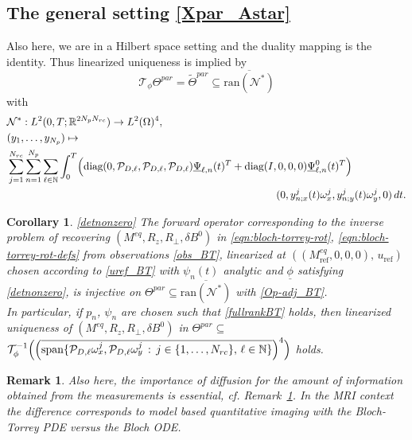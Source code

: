 \documentclass[12pt]{article}
\newtheorem{corollary}[theorem]{Corollary}
\newtheorem{remark}[theorem]{Remark}
\newcommand\Op{\mathcal{N}}
\newcommand\Proj{\mathcal{P}}
\newcommand\coilsens{\omega}
\newcommand\ulPsi{\underline{\Psi}}
\newcommand\Ncont{N_p}
\newcommand\Ncoil{N_{rc}}
\begin{document}
\subsection{The general setting \eqref{Xpar_Astar}} 
Also here, we are in a Hilbert space setting and the duality mapping is the identity. Thus linearized uniqueness is implied by 
\[
\mathcal{T}_\phi\Theta^{par}=\tilde{\Theta}^{par}\subseteq \overline{\text{ran}(\Op^*)}
\]
with 
\begin{equation}\label{Op-adj_BT}
\begin{aligned}
&\Op^*:L^2(0,T;\mathbb{R}^{2\Ncont\Ncoil})\to L^2(\Omega)^4, \quad \\ 
&(y_1,\ldots,y_{\Ncont})\mapsto\\ 
&\sum_{j=1}^{\Ncoil}\sum_{n=1}^{\Ncont}
\sum_{\ell\in\mathbb{N}}
\int_0^T 
\Bigl(\text{diag}(0,\Proj_{D,\ell},\Proj_{D,\ell},\Proj_{D,\ell})\ulPsi_{\ell,n}(t)^T
+\text{diag}(I,0,0,0)\ulPsi_{\ell,n}^0(t)^T
\Bigr)
\\&\hspace*{9cm}
(0,y_{n;x}^j(t)\coilsens_x^j,y_{n;y}^j(t)\coilsens_y^j,0)\, dt.
\end{aligned}
\end{equation}
\begin{corollary}\label{cor:BT}
\eqref{detnonzero} 
The forward operator corresponding to the inverse problem of recovering  $(M^{eq},R_z,R_\perp,\delta B^0)$ in \eqref{eqn:bloch-torrey-rot}, \eqref{eqn:bloch-torrey-rot-defs} from observations \eqref{obs_BT}, linearized at $((M^{eq}_{\text{ref}},0,0,0),\,u_{\text{ref}})$ chosen according to \eqref{uref_BT} with $\psi_n(t)$ analytic and $\underline{\phi}$ satisfying \eqref{detnonzero}, is injective on 
$\Theta^{par}\subseteq\overline{\text{ran}(\Op^*)}$ with \eqref{Op-adj_BT}.
\\
In particular, if $p_n$, $\psi_n$ are chosen such that \eqref{fullrankBT} holds, then linearized uniqueness of $(M^{eq},R_z,R_\perp,\delta B^0)$ in $\Theta^{par}\subseteq$ 
$
\mathcal{T}_\phi^{-1}\Bigl(\Bigl(\overline{\text{span}\{\Proj_{D,\ell}\coilsens_x^j,\Proj_{D,\ell}\coilsens_y^j\,:\, j\in\{1,\ldots,\Ncoil\},\,\ell\in\mathbb{N}\}}\Bigr)^4\Bigr)
$ holds.
\end{corollary}

\begin{remark}\label{rem:diff_BT}
Also here, the importance of diffusion for the amount of information obtained from the measurements is essential, cf. Remark~\ref{rem:diff_BT}.
In the MRI context the difference corresponds to model based quantitative imaging with the Bloch-Torrey PDE versus the Bloch ODE.
\end{remark}
\end{document}
